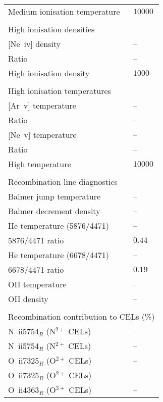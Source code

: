 \begin{longtable}[l]{ll}
 Medium ionisation temperature       & $10000$\\
 \vspace{0.2cm}\\\multicolumn{2}{l}{High ionisation densities}\\ \hline
 {}[Ne~{\sc iv}] density             & -- \\
 Ratio                               & -- \\
 High ionisation density             & $ 1000$\\
 \vspace{0.2cm}\\\multicolumn{2}{l}{High ionisation temperatures}\\ \hline
 {}[Ar~{\sc v}] temperature          & -- \\
 Ratio                               & -- \\
 {}[Ne~{\sc v}] temperature          & -- \\
 Ratio                               & -- \\
 High temperature                    & $10000$\\
 \vspace{0.2cm}\\\multicolumn{2}{l}{Recombination line diagnostics}\\ \hline
 Balmer jump temperature             & -- \\
 Balmer decrement density            & -- \\
 He temperature (5876/4471)          & -- \\
 5876/4471 ratio                     & $  0.44$\\
 He temperature (6678/4471)          & -- \\
 6678/4471 ratio                     & $  0.19$\\
 OII temperature                     & -- \\
 OII density                         & -- \\
 \vspace{0.2cm}\\\multicolumn{2}{l}{Recombination contribution to CELs (\%)}\\ \hline
 N~{\sc ii}5754$_R$ (N$^{2+}$ CELs)  & -- \\
 N~{\sc ii}5754$_R$ (N$^{2+}$ CELs)  & -- \\
 O~{\sc ii}7325$_R$ (O$^{2+}$ CELs)  & -- \\
 O~{\sc ii}7325$_R$ (O$^{2+}$ CELs)  & -- \\
 O~{\sc ii}4363$_R$ (O$^{3+}$ CELs)  & -- \\

\end{longtable}
